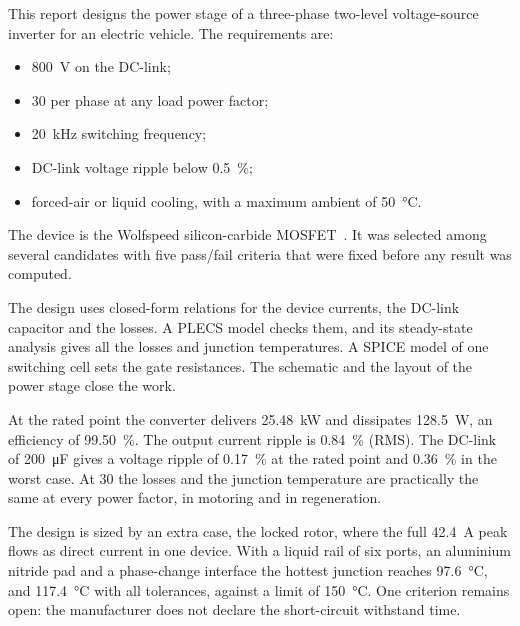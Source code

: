 This report designs the power stage of a three-phase two-level voltage-source
inverter for an electric vehicle. The requirements are:
\begin{itemize}
  \item \SI{800}{\volt} on the DC-link;
  \item \SI{30}{\Arms} per phase at any load power factor;
  \item \SI{20}{\kilo\hertz} switching frequency;
  \item DC-link voltage ripple below \SI{0.5}{\percent};
  \item forced-air or liquid cooling, with a maximum ambient of \SI{50}{\celsius}.
\end{itemize}
The device is the Wolfspeed \device{} silicon-carbide MOSFET~\cite{wolfspeed_e3m0016}.
It was selected among several candidates with five pass/fail criteria that
were fixed before any result was computed.

The design uses closed-form relations for the device currents, the DC-link
capacitor and the losses. A PLECS model checks them, and its steady-state
analysis gives all the losses and junction temperatures. A SPICE model of one
switching cell sets the gate resistances. The schematic and the layout of the
power stage close the work.

At the rated point the converter delivers \SI{25.48}{\kilo\watt} and
dissipates \SI{128.5}{\watt}, an efficiency of \SI{99.50}{\percent}. The
output current ripple is \SI{0.84}{\percent} (RMS). The DC-link of
\SI{200}{\micro\farad} gives a voltage ripple of \SI{0.17}{\percent} at the
rated point and \SI{0.36}{\percent} in the worst case. At \SI{30}{\Arms} the
losses and the junction temperature are practically the same at every power
factor, in motoring and in regeneration.

The design is sized by an extra case, the locked rotor, where the full
\SI{42.4}{\ampere} peak flows as direct current in one device. With a liquid
rail of six ports, an aluminium nitride pad and a phase-change interface the
hottest junction reaches \SI{97.6}{\celsius}, and \SI{117.4}{\celsius} with
all tolerances, against a limit of \SI{150}{\celsius}. One criterion remains
open: the manufacturer does not declare the short-circuit withstand time.
